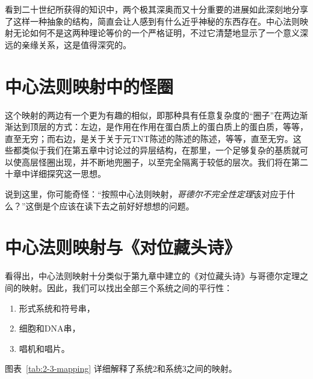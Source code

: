看到二十世纪所获得的知识中，两个极其深奥而又十分重要的进展如此深刻地分享了这样一种抽象的结构，简直会让人感到有什么近乎神秘的东西存在。中心法则映射无论如何不是这两种理论等价的一个严格证明，不过它清楚地显示了一个意义深远的亲缘关系，这是值得深究的。

\section{中心法则映射中的怪圈}

这个映射的两边有一个更为有趣的相似，即那种具有任意复杂度的“圈子”在两边渐渐达到顶层的方式：左边，是作用在作用在蛋白质上的蛋白质上的蛋白质，等等，直至无穷；而右边，是关于关于元TNT陈述的陈述的陈述，等等，直至无穷。这些都类似于我们在第五章中讨论过的异层结构，在那里，一个足够复杂的基质就可以使高层怪圈出现，并不断地兜圈子，以至完全隔离于较低的层次。我们将在第二十章中详细探究这一思想。

说到这里，你可能奇怪：“按照中心法则映射，\emph{哥德尔不完全性定理}该对应于什么？”这倒是个应该在读下去之前好好想想的问题。

\section{中心法则映射与《对位藏头诗》}

看得出，中心法则映射十分类似于第九章中建立的《对位藏头诗》与哥德尔定理之间的映射。因此，我们可以找出全部三个系统之间的平行性：
\begin{enumerate}
\item 形式系统和符号串，
\item 细胞和DNA串，
\item 唱机和唱片。
\end{enumerate}
图表~\ref{tab:2-3-mapping} 详细解释了系统2和系统3之间的映射。

